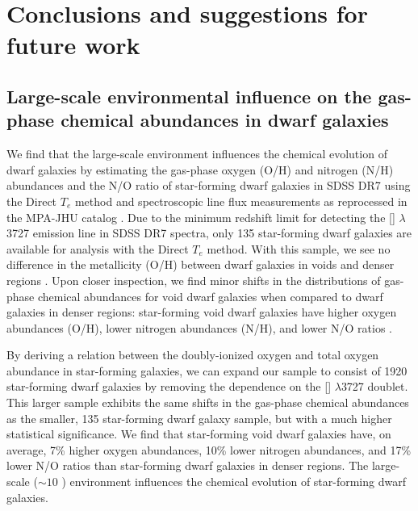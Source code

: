 \chapter[Conclusion]{Conclusions and suggestions for future work}

\section[Chemical abundances]{Large-scale environmental influence on the gas-phase chemical abundances in dwarf galaxies}
We find that the large-scale environment influences the chemical evolution of 
dwarf galaxies by estimating the gas-phase oxygen (O/H) and nitrogen (N/H) 
abundances and the N/O ratio of star-forming dwarf galaxies in SDSS DR7 using 
the Direct $T_e$ method and spectroscopic line flux measurements as reprocessed 
in the MPA-JHU catalog \citep[Douglass et al., 2017, in prep]{Douglass17a,
Douglass17b}.  Due to the minimum redshift limit for detecting the [] 
$\lambda$3727 emission line in SDSS DR7 spectra, only 135 star-forming dwarf 
galaxies are available for analysis with the Direct $T_e$ method.  With this 
sample, we see no difference in the metallicity (O/H) between dwarf galaxies in 
voids and denser regions \citep{Douglass17a}.  Upon closer inspection, we find 
minor shifts in the distributions of gas-phase chemical abundances for void 
dwarf galaxies when compared to dwarf galaxies in denser regions: star-forming 
void dwarf galaxies have higher oxygen abundances (O/H), lower nitrogen 
abundances (N/H), and lower N/O ratios \citep{Douglass17b}.

By deriving a relation between the doubly-ionized oxygen and total oxygen 
abundance in star-forming galaxies, we can expand our sample to consist of 1920 
star-forming dwarf galaxies by removing the dependence on the [] 
$\lambda$3727 doublet.  This larger sample exhibits the same shifts in the 
gas-phase chemical abundances as the smaller, 135 star-forming dwarf galaxy 
sample, but with a much higher statistical significance.  We find that 
star-forming void dwarf galaxies have, on average, 7\% higher oxygen abundances, 
10\% lower nitrogen abundances, and 17\% lower N/O ratios than star-forming 
dwarf galaxies in denser regions.  The large-scale ($\sim 10$ \hMpc) environment 
influences the chemical evolution of star-forming dwarf galaxies.

